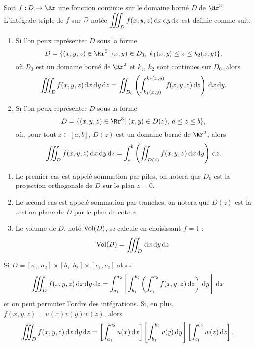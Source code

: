 \documentclass[class=report,crop=false]{standalone}
\begin{document}
\begin{theoreme}Soit $f:D\to \Rr$ une fonction continue sur le domaine borné $D$ de $\Rr^3$. L'intégrale triple de $f$ sur $D$ notée $\displaystyle \int \!\!\!\!\int \!\!\!\!\int_{D}f(x,y,z)\d x\d y\d z$ est définie comme suit.

\vskip2mm

\begin{enumerate}
\item Si l'on peux représenter $D$ sous la forme
$$D=\{(x,y,z)\in \Rr^3|\; (x,y)\in D_0,\; k_1(x,y)\leq z\leq k_2(x,y)\},$$
o\`u $D_0$ est un domaine borné de $\Rr^2$ et $k_1$, $k_2$ sont continues sur $D_0$, alors
$$\int \!\!\!\!\int \!\!\!\!\int _Df(x,y,z)\d x\d y \d z=\int \!\!\!\!\int _{D_0}\left(\int _{k_1 (x,y)}^{k_2 (x,y)}f(x,y,z)\d z\right)\d x\d y.$$

\vskip2mm

\item Si l'on peux représenter $D$ sous la forme
$$D=\{(x,y,z)\in \Rr^3|\; (x,y)\in D(z),\; a\leq z\leq b\},$$
o\`u, pour tout $z\in [a,b]$, $D(z)$ est un domaine borné de $\Rr^2$, alors
$$\int \!\!\!\!\int \!\!\!\!\int _Df(x,y,z)\d x\d y \d z=\int _a^b\left(\int \!\!\!\!\int _{D(z)}f(x,y,z)\d x\d y\right)\d z.$$
\end{enumerate}
\end{theoreme}

\vskip6mm

\begin{enumerate}
\item Le premier cas est appelé sommation par piles, on notera que $D_0$ est la projection orthogonale de $D$ sur le plan $z=0$.
\item Le second cas est appelé sommation par tranches, on notera que $D(z)$ est la section plane de $D$ par le plan de cote $z$.
\item Le volume de $D$, noté ${\rm Vol} (D)$, se calcule en choisissant $f=1$ :
$$\vol (D)=\int \!\!\!\!\int \!\!\!\!\int _D\d x\d y \d z.$$
\end{enumerate}

\vskip6mm

\begin{corollaire}Si $D=[a_1,a_2]\times [b_1,b_2]\times [c_1,c_2]$ alors 
$$\int \!\!\!\!\int \!\!\!\!\int_{D}f(x,y,z)\d x\d y\d z=\int _{a_1}^{a_2}\left[\int _{b_1}^{b_2}\left(\int _{c_1}^{c_2}f(x,y,z)\d z\right)\d y\right]\d x$$
et on peut permuter l'ordre des intégrations. Si, en plus, $f(x,y,z)=u(x)v(y)w(z)$, alors
$$\int \!\!\!\!\int \!\!\!\!\int_{D}f(x,y,z)\d x\d y\d z=\left[\int _{a_1}^{a_2}u(x)\d x\right]\left[\int _{b_1}^{b_2}v(y)\d y\right]\left[\int _{c_1}^{c_2}w(z)\d z\right].$$
\end{corollaire}
\end{document}
